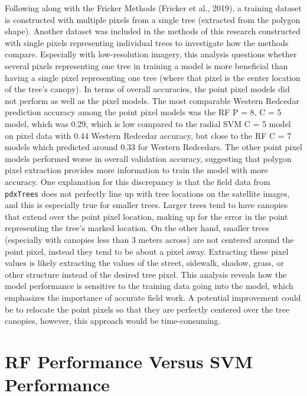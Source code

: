 \documentclass[12pt,twoside]{reedthesis}
\begin{document}
Following along with the Fricker Methods (Fricker et al., 2019), a training dataset is constructed with multiple pixels from a single tree (extracted from the polygon shape). Another dataset was included in the methods of this research constructed with single pixels representing individual trees to investigate how the methods compare. Especially with low-resolution imagery, this analysis questions whether several pixels representing one tree in training a model is more beneficial than having a single pixel representing one tree (where that pixel is the center location of the tree's canopy). In terms of overall accuracies, the point pixel models did not perform as well as the pixel models. The most comparable Western Redcedar prediction accuracy among the point pixel models was the RF P = 8, C = 5 model, which was 0.29, which is low compared to the radial SVM C = 5 model on pixel data with 0.44 Western Redcedar accuracy, but close to the RF C = 7 models which predicted around 0.33 for Western Redcedars. The other point pixel models performed worse in overall validation accuracy, suggesting that polygon pixel extraction provides more information to train the model with more accuracy. One explanation for this discrepancy is that the field data from \texttt{pdxTrees} does not perfectly line up with tree locations on the satellite images, and this is especially true for smaller trees. Larger trees tend to have canopies that extend over the point pixel location, making up for the error in the point representing the tree's marked location. On the other hand, smaller trees (especially with canopies less than 3 meters across) are not centered around the point pixel, instead they tend to be about a pixel away. Extracting these pixel values is likely extracting the values of the street, sidewalk, shadow, grass, or other structure instead of the desired tree pixel. This analysis reveals how the model performance is sensitive to the training data going into the model, which emphasizes the importance of accurate field work. A potential improvement could be to relocate the point pixels so that they are perfectly centered over the tree canopies, however, this approach would be time-consuming.

\hypertarget{rf-performance-versus-svm-performance}{%
\section{RF Performance Versus SVM Performance}\label{rf-performance-versus-svm-performance}}
\end{document}
